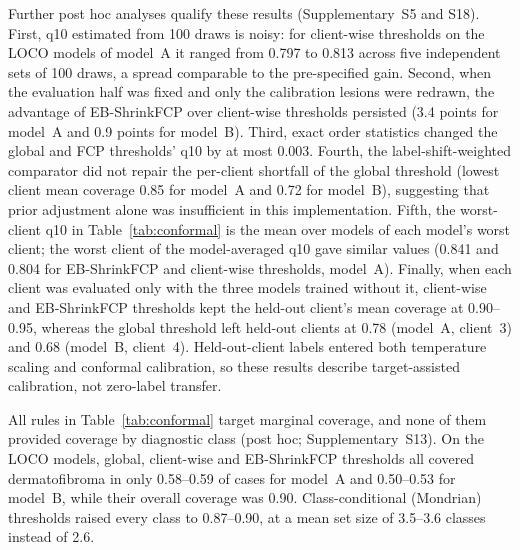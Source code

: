 \documentclass[VANCOUVER,Times1COL]{WileyNJDv5}
\begin{document}
Further post hoc analyses qualify these results (Supplementary~S5 and S18). First, q10 estimated from 100
draws is noisy: for client-wise thresholds on the LOCO models of model~A it ranged from 0.797 to 0.813 across
five independent sets of 100 draws, a spread comparable to the pre-specified gain. Second, when the
evaluation half was fixed and only the calibration lesions were redrawn, the advantage of EB-ShrinkFCP over
client-wise thresholds persisted (3.4 points for model~A and 0.9 points for model~B). Third, exact order
statistics changed the global and FCP thresholds' q10 by at most 0.003. Fourth, the label-shift-weighted
comparator did not repair the per-client shortfall of the global threshold (lowest client mean coverage
0.85 for model~A and 0.72 for model~B), suggesting that prior adjustment alone was insufficient in this
implementation. Fifth, the worst-client q10 in Table~\ref{tab:conformal} is the mean over models of each
model's worst client; the worst client of the model-averaged q10 gave similar values (0.841 and 0.804 for
EB-ShrinkFCP and client-wise thresholds, model~A). Finally, when each client was evaluated only with the
three models trained without it, client-wise and EB-ShrinkFCP thresholds kept the held-out client's mean
coverage at 0.90--0.95, whereas the global threshold left held-out clients at 0.78 (model~A, client~3) and
0.68 (model~B, client~4). Held-out-client labels entered both temperature scaling and conformal calibration,
so these results describe target-assisted calibration, not zero-label transfer.

All rules in Table~\ref{tab:conformal} target marginal coverage, and none of them provided coverage by
diagnostic class (post hoc; Supplementary~S13). On the LOCO models, global, client-wise and EB-ShrinkFCP
thresholds all covered dermatofibroma in only 0.58--0.59 of cases for model~A and 0.50--0.53 for model~B,
while their overall coverage was 0.90. Class-conditional (Mondrian) thresholds raised every class to
0.87--0.90, at a mean set size of 3.5--3.6 classes instead of 2.6.
\end{document}
